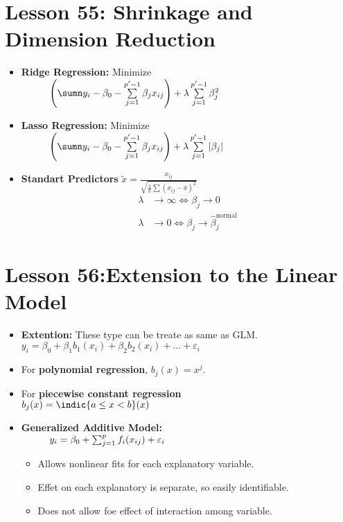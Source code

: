 \documentclass[10pt, french]{article}
\begin{document}
\begin{multicols*}{3}
\section*{Lesson 55: Shrinkage and Dimension Reduction}
\begin{itemize}[align=left,leftmargin=*]
   \item  \textbf{Ridge Regression:} Minimize \\
   $\hspace{1cm} \left(\sumn y_i - \beta_0 - \sum\limits_{j=1}^{p'-1} \beta_j x_{ij}\right) + \lambda \sum\limits_{j=1}^{p'-1} \beta_j^2$
   \item \textbf{Lasso Regression:} Minimize \\
   $\hspace{1cm} \left(\sumn y_i - \beta_0 - \sum\limits_{j=1}^{p'-1} \beta_j x_{ij}\right) + \lambda \sum\limits_{j=1}^{p'-1} |\beta_j|$
   \item \textbf{Standart Predictors} $\tilde{x} = \frac{x_{ij}}{\sqrt{\frac{1}{n}\sum (x_{ij}-\bar{x})^2}}$
   \begin{align*}
      \lambda &\to \infty \Leftrightarrow \beta_j \to 0 \\
      \lambda &\to 0 \Leftrightarrow \beta_j \to \hat{\beta}_j^{\mathrm{normal}}
   \end{align*}
\end{itemize}

\section*{Lesson 56:Extension to the Linear Model}
\begin{itemize}[align=left,leftmargin=*]
   \item \textbf{Extention:} These type can be treate as same as GLM. $y_i = \beta_0 + \beta_1 b_1(x_i) + \beta_2 b_2(x_i) + ... + \varepsilon_i$
   \item[] For \textbf{polynomial regression}, $b_j(x) = x^j$.
   \item[] For \textbf{piecewise constant regression} \\ $ b_j(x) = \indic{a\leq x<b}(x) $
   \item \textbf{Generalized Additive Model:} \\
   $\hspace*{1cm} y_i = \beta_0 + \sum_{j=1}^p f_i(x_{ij}) + \varepsilon_i$
   \begin{itemize}
      \item Allows nonlinear fits for each explanatory variable.
      \item Effet on each explanatory is separate, so easily identifiable.
      \item Does not allow foe effect of interaction among variable.
   \end{itemize}
\end{itemize}



\end{multicols*}
\end{document}
